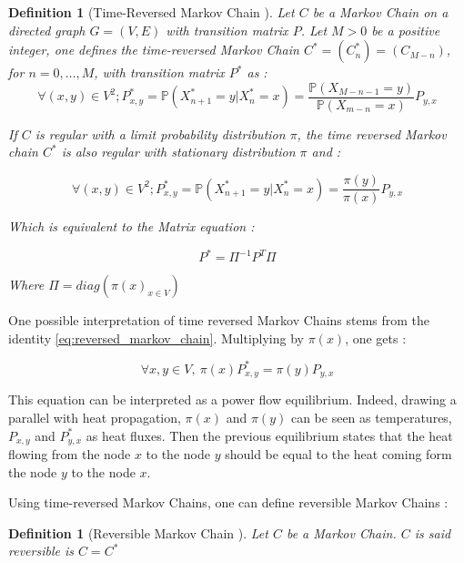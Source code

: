 \documentclass[sn-mathphys]{sn-jnl}%
\theoremstyle{thmstyleone}%
\theoremstyle{thmstyletwo}%
\theoremstyle{thmstylethree}%
\newtheorem{definition}[theo]{Definition}
\begin{document}
\begin{definition}[Time-Reversed Markov Chain \cite{sevi2019}]\label{def:time_reversed_chain}
  Let $C$ be a Markov Chain on a directed graph $G=(V,E)$ with
  transition matrix $P$. Let $M>0$ be a positive integer, one defines
  the time-reversed Markov Chain $C^* = (C_n^*) = (C_{M-n})$, for
  $n = 0, \hdots, M$, with transition matrix $P^*$ as :
\begin{equation}
    \forall (x,y) \in V^2 ; P^*_{x,y} = \mathbb{P}(X^*_{n+1} = y | X^*_n = x) = \frac{\mathbb{P}(X_{M-n-1} = y)}{\mathbb{P}(X_{m-n}=x)} P_{y,x}
\end{equation}

If $C$ is regular with a limit probability distribution $\pi$, the
time reversed Markov chain $C^*$ is also regular with stationary
distribution $\pi$ and :

\begin{equation} \label{eq:reversed_markov_chain}
    \forall (x,y) \in V^2 ; P^*_{x,y} = \mathbb{P}(X^*_{n+1} = y | X^*_n = x) = \frac{\pi(y)}{\pi(x)} P_{y,x}
\end{equation}

Which is equivalent to the Matrix equation :

\begin{equation}
    P^* = \Pi^{-1} P^T \Pi
\end{equation}

Where $\Pi = diag(\pi(x)_{x\in V})$

\end{definition}

One possible interpretation of time reversed Markov Chains stems from
the identity \ref{eq:reversed_markov_chain}. Multiplying by $\pi(x)$,
one gets :

\begin{equation}\label{eq:power_equilibrium}
  \forall x,y \in V, \ \pi(x) P^*_{x,y} = \pi(y) P_{y,x}
\end{equation}

This equation can be interpreted as a power flow equilibrium. Indeed,
drawing a parallel with heat propagation, $\pi(x)$ and $\pi(y)$ can be
seen as temperatures, $P_{x,y}$ and $P^*_{y,x}$ as heat fluxes. Then
the previous equilibrium states that the heat flowing from the node
$x$ to the node $y$ should be equal to the heat coming form the node
$y$ to the node $x$.

Using time-reversed Markov Chains, one can define reversible Markov
Chains :

\begin{definition}[Reversible Markov Chain \cite{sevi2019}]
Let $C$ be a Markov Chain. $C$ is said reversible is $C = C^*$
\end{definition}
\end{document}
